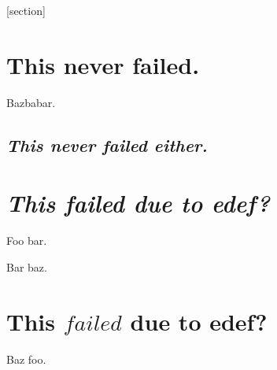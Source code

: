 \documentclass{article}
\begin{document}
[section]

\section{This never failed.}

\begin{thmrep}
  Bazbabar.
\end{thmrep}

\subsection{\textit{This never failed either.}}

\section{\textit{This failed due to edef?}}

\begin{thmrep}
  Foo bar.
\end{thmrep}


\begin{thmrep}
  Bar baz.
\end{thmrep}

\section{This $\mathit{failed}$ due to edef?}

\begin{thmrep}
  Baz foo.\end{thmrep}
\end{document}
